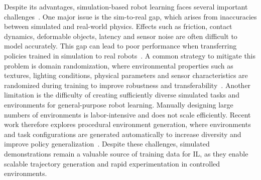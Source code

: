 	Despite its advantages, simulation-based robot learning faces several important challenges~\cite{Bharadhwaj2024PositionSS}. One major issue is the sim-to-real gap, which arises from inaccuracies between simulated and real-world physics. Effects such as friction, contact dynamics, deformable objects, latency and sensor noise are often difficult to model accurately. This gap can lead to poor performance when transferring policies trained in simulation to real robots~\cite{DBLP:journals/corr/abs-2009-13303}.
	A common strategy to mitigate this problem is domain randomization, 
	where environmental properties such as textures, lighting conditions, physical parameters and sensor characteristics 
	are randomized during training to improve robustness and transferability~\cite{Tobin2017DomainRF}.
	Another limitation is the difficulty of creating sufficiently diverse simulated tasks and environments for general-purpose robot learning. Manually designing large numbers of environments is labor-intensive and does not scale efficiently. Recent work therefore explores procedural environment generation, where environments and task configurations are generated automatically to increase diversity and improve policy generalization~\cite{Deitke2022ProcTHORLE, Team2023HumanTimescaleAI, Xian2023TowardsGR, Faldor2024OMNIEPICOV, Wang2023RoboGenTU}.
	Despite these challenges, simulated demonstrations remain a valuable source of training data for \ac{IL}, as they enable scalable trajectory generation and rapid experimentation in controlled environments.



